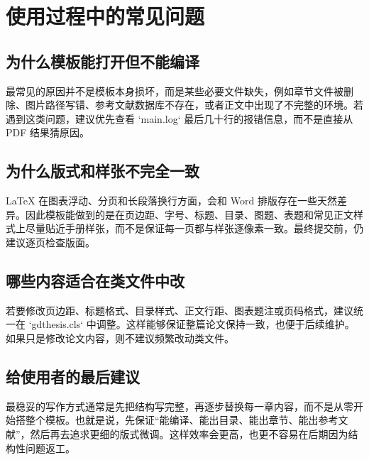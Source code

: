 \chapter{使用过程中的常见问题}

\section{为什么模板能打开但不能编译}
最常见的原因并不是模板本身损坏，而是某些必要文件缺失，例如章节文件被删除、图片路径写错、参考文献数据库不存在，或者正文中出现了不完整的环境。若遇到这类问题，建议优先查看 `main.log` 最后几十行的报错信息，而不是直接从 PDF 结果猜原因。

\section{为什么版式和样张不完全一致}
LaTeX 在图表浮动、分页和长段落换行方面，会和 Word 排版存在一些天然差异。因此模板能做到的是在页边距、字号、标题、目录、图题、表题和常见正文样式上尽量贴近手册样张，而不是保证每一页都与样张逐像素一致。最终提交前，仍建议逐页检查版面。

\section{哪些内容适合在类文件中改}
若要修改页边距、标题格式、目录样式、正文行距、图表题注或页码格式，建议统一在 `gdthesis.cls` 中调整。这样能够保证整篇论文保持一致，也便于后续维护。如果只是修改论文内容，则不建议频繁改动类文件。

\section{给使用者的最后建议}
最稳妥的写作方式通常是先把结构写完整，再逐步替换每一章内容，而不是从零开始搭整个模板。也就是说，先保证“能编译、能出目录、能出章节、能出参考文献”，然后再去追求更细的版式微调。这样效率会更高，也更不容易在后期因为结构性问题返工。

